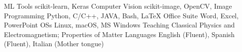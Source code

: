 

\begin{cvskills}
  \cvskill
    {ML Tools}
    {scikit-learn, Keras}
  \cvskill
    {Computer Vision}
    {scikit-image, OpenCV, Image}
  \cvskill
    {Programming} %
    {Python, C/C++, JAVA, Bash, LaTeX} %
  \cvskill
    {Office Suite}
    {Word, Excel, PowerPoint}
  \cvskill
    {OSs}
    {Linux, macOS, MS Windows}
  \cvskill
    {Teaching}
    {Classical Physics and Electromagnetism; Properties of Matter}
  \cvskill
    {Languages} %
    {English (Fluent), Spanish (Fluent), Italian (Mother tongue)} %
\end{cvskills}

